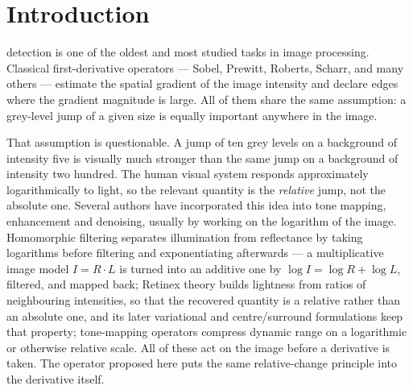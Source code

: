 \documentclass[conference]{IEEEtran}
\begin{document}
\section{Introduction}
\label{sec:intro}
 detection is one of the oldest and most studied tasks
in image processing.  Classical first-derivative operators --- Sobel,
Prewitt, Roberts, Scharr, and many others --- estimate the spatial gradient
of the image intensity and declare edges where the gradient magnitude is
large.  All of them share the same assumption: a grey-level jump of a given
size is equally important anywhere in the image.

That assumption is questionable.  A jump of ten grey levels on a background
of intensity five is visually much stronger than the same jump on a
background of intensity two hundred.  The human visual system responds
approximately logarithmically to light\cite{fechner}, so the relevant quantity
is the \emph{relative} jump, not the absolute one.  Several authors have
incorporated this idea into tone mapping, enhancement and denoising, usually
by working on the logarithm of the image.  Homomorphic filtering separates
illumination from reflectance by taking logarithms before filtering and
exponentiating afterwards --- a multiplicative image model $I=R\cdot L$ is
turned into an additive one by $\log I=\log R+\log L$, filtered, and mapped
back\cite{homomorphic}; Retinex theory builds lightness
from ratios of neighbouring intensities, so that the recovered quantity is a
relative rather than an absolute one\cite{land1971,land1977}, and its later
variational and centre/surround formulations keep that
property\cite{jobson1997,kimmel2003}; tone-mapping operators compress
dynamic range on a logarithmic or otherwise relative
scale\cite{reinhard,drago2003}.  All of these act on the image before a derivative is
taken.  The operator proposed here puts the same relative-change principle
into the derivative itself.
\end{document}
